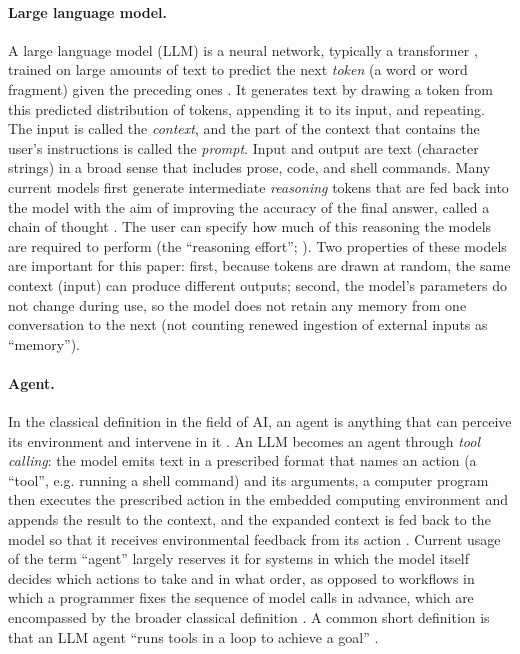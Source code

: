 \documentclass[10pt]{article}
\begin{document}
\paragraph{Large language model.} A large language model (LLM) is a neural network, typically a transformer \citep{vaswani2017attention}, trained on large amounts of text to predict the next \emph{token} (a word or word fragment) given the preceding ones \citep{brown2020language}. It generates text by drawing a token from this predicted distribution of tokens, appending it to its input, and repeating. The input is called the \emph{context}, and the part of the context that contains the user's instructions is called the \emph{prompt}. Input and output are text (character strings) in a broad sense that includes prose, code, and shell commands. Many current models first generate intermediate \emph{reasoning} tokens that are fed back into the model with the aim of improving the accuracy of the final answer, called a chain of thought \citep{wei2022chain}. The user can specify how much of this reasoning the models are required to perform (the ``reasoning effort''; \citealp{openai2026reasoning}). Two properties of these models are important for this paper: first, because tokens are drawn at random, the same context (input) can produce different outputs; second, the model's parameters do not change during use, so the model does not retain any memory from one conversation to the next (not counting renewed ingestion of external inputs as ``memory'').

\paragraph{Agent.} In the classical definition in the field of AI, an agent is anything that can perceive its environment and intervene in it \citep[Chapter~2]{russell2021artificial}. An LLM becomes an agent through \emph{tool calling}: the model emits text in a prescribed format that names an action (a ``tool'', e.g. running a shell command) and its arguments, a computer program then executes the prescribed action in the embedded computing environment and appends the result to the context, and the expanded context is fed back to the model so that it receives environmental feedback from its action \citep{yao2023react}. Current usage of the term ``agent'' largely reserves it for systems in which the model itself decides which actions to take and in what order, as opposed to workflows in which a programmer fixes the sequence of model calls in advance, which are encompassed by the broader classical definition \citep{anthropic2024agents}. A common short definition is that an LLM agent ``runs tools in a loop to achieve a goal'' \citep{willison2025agents}.
\end{document}
